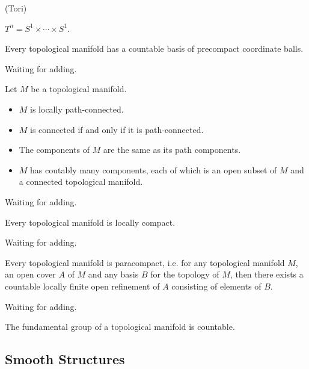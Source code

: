 \begin{example}(Tori)\par
    $T^n = S^1\times \cdots \times S^1$.
\end{example}

\begin{lemma}
    Every topological manifold has a countable basis of precompact coordinate balls.\par
\end{lemma}
\Pf\par
    Waiting for adding.

\begin{proposition}
    Let $M$ be a topological manifold.\par
    \begin{itemize}
        \item $M$ is locally path-connected.\par
        \item $M$ is connected if and only if it is path-connected.
        \item The components of $M$ are the same as its path components.\par
        \item $M$ has coutably many components, each of which is an open subset of $M$ and a connected topological manifold.
    \end{itemize}
\end{proposition}
\Pf\par
    Waiting for adding.

\begin{proposition}
    Every topological manifold is locally compact.
\end{proposition}
\Pf\par
    Waiting for adding.

\begin{theorem}
    Every topological manifold is paracompact, i.e. for any topological manifold $M$, an open cover $A$ of $M$ and any basis $B$ for the topology of $M$, then there exists a countable locally finite open refinement of $A$ consisting of elements of $B$.
\end{theorem}
\Pf\par
    Waiting for adding.

\begin{proposition}
    The fundamental group of a topological manifold is countable.
\end{proposition}

\subsection{Smooth Structures}

